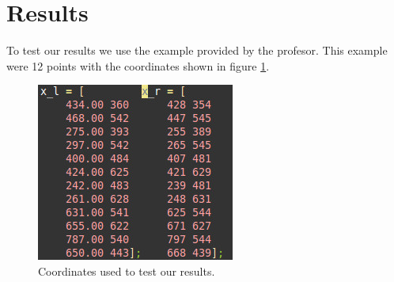 \documentclass[a4paper,12pt]{article}
\begin{document}
    \section{Results}
    To test our results we use the example provided by the profesor. This example were
    12 points with the coordinates shown in figure \ref{fig:epts}.
    \begin{figure}[h]
        \centering
        \includegraphics[totalheight=.20\textheight]{./images/Ppts.jpg}
        \caption{Coordinates used to test our results.}
        \label{fig:epts}
    \end{figure}


    
\end{document}
